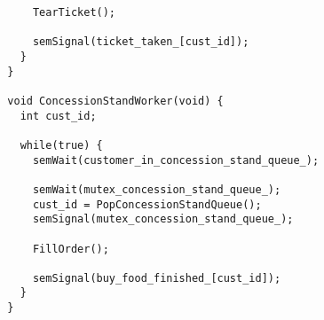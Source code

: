 \documentclass[a4paper]{report}
\begin{document}
\begin{lstlisting}
      TearTicket();

      semSignal(ticket_taken_[cust_id]);
    }
  }

  void ConcessionStandWorker(void) {
    int cust_id;

    while(true) {
      semWait(customer_in_concession_stand_queue_);

      semWait(mutex_concession_stand_queue_);
      cust_id = PopConcessionStandQueue();
      semSignal(mutex_concession_stand_queue_);

      FillOrder();

      semSignal(buy_food_finished_[cust_id]);
    }
  }
\end{lstlisting}
\end{document}
